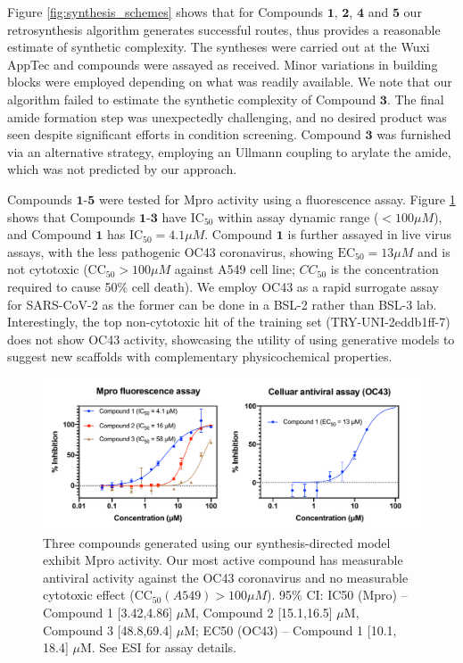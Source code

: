 Figure \ref{fig:synthesis_schemes} shows that for Compounds $\mathbf{1}$, $\mathbf{2}$, $\mathbf{4}$ and $\mathbf{5}$ our retrosynthesis algorithm generates successful routes, thus provides a reasonable estimate of synthetic complexity. The syntheses were carried out at the Wuxi AppTec and compounds were assayed as received. Minor variations in building blocks were employed depending on what was readily available. We note that our algorithm failed to estimate the synthetic complexity of Compound $\mathbf{3}$. The final amide formation step was unexpectedly challenging, and no desired product was seen despite significant efforts in condition screening. Compound $\mathbf{3}$ was furnished via an alternative strategy, employing an Ullmann coupling to arylate the amide, which was not predicted by our approach. 

Compounds $\mathbf{1}$-$\mathbf{5}$ were tested for Mpro activity using a fluorescence assay. Figure \ref{fig:data} shows that Compounds $\mathbf{1}$-$\mathbf{3}$ have $\mathrm{IC}_{50}$ within assay dynamic range ($<100 \mu M$), and Compound $\mathbf{1}$ has $\mathrm{IC}_{50} = 4.1 \mu M$. Compound $\mathbf{1}$ is further assayed in live virus assays, with the less pathogenic OC43 coronavirus, showing $\mathrm{EC}_{50} = 13 \mu M$ and is not cytotoxic ($\mathrm{CC}_{50}>100 \mu M$ against A549 cell line; $CC_{50}$ is the concentration required  to cause 50\% cell death). We employ OC43 as a rapid surrogate assay for SARS-CoV-2 as the former can be done in a BSL-2 rather than BSL-3 lab.  Interestingly, the top non-cytotoxic hit of the training set (TRY-UNI-2eddb1ff-7) does not show OC43 activity, showcasing the utility of using generative models to suggest new scaffolds with complementary physicochemical properties. 

\begin{figure}
\centering
         \includegraphics[scale=0.36]{Chapters/Ranking/Figs/data_curve.pdf}
    \caption{Three compounds generated using our synthesis-directed model exhibit Mpro activity. Our most active compound has measurable antiviral activity against the OC43 coronavirus and no measurable cytotoxic effect ($\mathrm{CC}_{50} (A549)>100 \mu M$). 95\% CI: IC50 (Mpro) -- Compound 1 [3.42,4.86] $\mu$M, Compound 2 [15.1,16.5] $\mu$M, Compound 3 [48.8,69.4] $\mu$M; EC50 (OC43) -- Compound 1 [10.1, 18.4] $\mu$M. See ESI for assay details.}
    \label{fig:data}
\end{figure}

